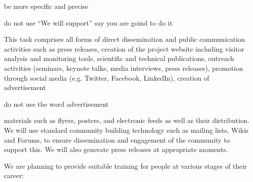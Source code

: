 \begin{workpackage}[id=dissemination,type=MGT,wphases=1-48,
  short={Dissemination},
  title={Dissemination, communication and exploitation},
  lead=Lie,LieRM=2,InrRM=6,BirRM=4,CleRM=2,ImtRM=2,StrRM=2,ZibRM=14,EduRM=12]
\begin{tasklist}

  \begin{task}[id=com,
      title=Communication,
      lead=Inr,InrRM=12,wphases=1-48!.25]

    {\color{red} be more specific and precise}

    {\color{red} do not use ``We will support'' say you are goind to do it}

    This task comprises all forms of direct dissemination and public
    communication activities such as press releases, creation of the
    project website including visitor analysis and monitoring
    tools, scientific and technical publications, outreach activities
    (seminars, keynote talks, media interviews, press releases),
    promotion through social media (e.g.  Twitter, Facebook,
    LinkedIn), creation of advertisement

{\color{red} do not use the word advertisement}

    materials such as flyers,
    posters, and electronic feeds as well as their distribution. We
    will use standard community building technology such as mailing
    lists, Wikis and Forums, to ensure dissemination and engagement of
    the community to support this. We will also generate press
    releases at appropriate moments.
  \end{task}

  \begin{task}[id=training,
      title=Training Logipedia developers and users,
      lead=Bir,BirRM=2,wphases=1-48!.05]
    We are planning to provide suitable training
    for people at various stages of their career:


\end{task}
\end{tasklist}
\end{workpackage}
